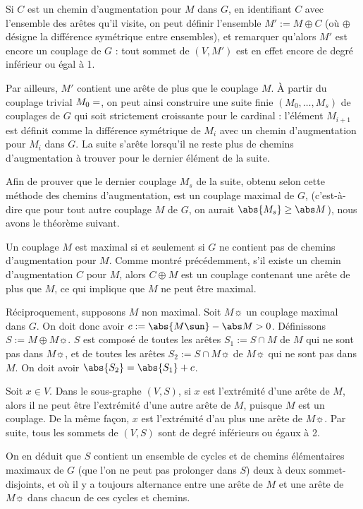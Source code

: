  Si $C$ est un chemin d'augmentation pour $M$ dans $G$, en identifiant $C$ avec l'ensemble des arêtes qu'il visite, on peut définir l'ensemble $M' := M \oplus C$ (où $\oplus$ désigne la différence symétrique entre ensembles), et remarquer qu'alors $M'$ est encore un couplage de $G$ : tout sommet de $(V, M')$ est en effet encore de degré inférieur ou égal à 1.
 
 Par ailleurs, $M'$ contient une arête de plus que le couplage $M$. À partir du couplage trivial $M_0 = \empty$, on peut ainsi construire une suite finie $(M_0,\dots,M_s)$ de couplages de $G$ qui soit strictement croissante pour le cardinal : l'élément $M_{i+1}$ est définit comme la différence symétrique de $M_i$ avec un chemin d'augmentation pour $M_i$ dans $G$. La suite s'arête lorsqu'il ne reste plus de chemins d'augmentation à trouver pour le dernier élément de la suite.
 
 Afin de prouver que le dernier couplage $M_s$ de la suite, obtenu selon cette méthode des chemins d'augmentation, est un couplage maximal de $G$, (c'est-à-dire que pour tout autre couplage $M$ de $G$, on aurait $\abs{M_s} \geq \abs M$), nous avons le théorème suivant.
 
 \SEP{}
    Un couplage $M$ est maximal si et seulement si $G$ ne contient pas de chemins d'augmentation pour $M$.
 \SEP\jpreuve
    Comme montré précédemment, s'il existe un chemin d'augmentation $C$ pour $M$, alors $C \oplus M$ est un couplage contenant une arête de plus que $M$, ce qui implique que $M$ ne peut être maximal.
    
    Réciproquement, supposons $M$ non maximal. Soit $M\sun$ un couplage maximal dans $G$. On doit donc avoir $c := \abs {M\sun} - \abs M > 0$. Définissons $S := M \oplus M\sun$. $S$ est composé de toutes les arêtes $S_1 := S \cap M$ de $M$ qui ne sont pas dans $M\sun$, et de toutes les arêtes $S_2 := S \cap M\sun$ de $M\sun$ qui ne sont pas dans $M$. On doit avoir $\abs{S_2} = \abs{S_1}+c$.
    
    Soit $x \in V$. Dans le sous-graphe $(V, S)$, si $x$ est l'extrémité d'une arête de $M$, alors il ne peut être l'extrémité d'une autre arête de $M$, puisque $M$ est un couplage. De la même façon, $x$ est l'extrémité d'au plus une arête de $M\sun$. Par suite, tous les sommets de $(V,S)$ sont de degré inférieurs ou égaux à 2.
    
    On en déduit que $S$ contient un ensemble de cycles et de chemins élémentaires maximaux de $G$ (que l'on ne peut pas prolonger dans $S$) deux à deux sommet-disjoints, et où il y a toujours alternance entre une arête de $M$ et une arête de $M\sun$ dans chacun de ces cycles et chemins.
    
